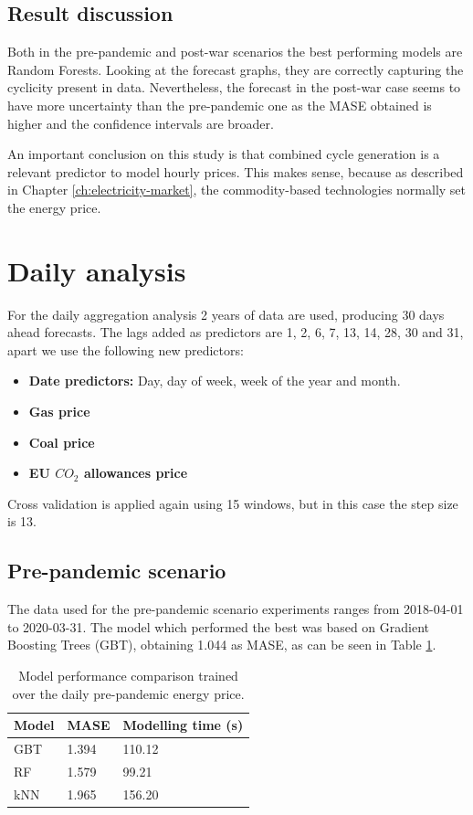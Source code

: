 \subsection{Result discussion}
Both in the pre-pandemic and post-war scenarios the best performing models are Random Forests. Looking at the forecast graphs, they are correctly capturing the cyclicity present in data. Nevertheless, the forecast in the post-war case seems to have more uncertainty than the pre-pandemic one as the MASE obtained is higher and the confidence intervals are broader.

An important conclusion on this study is that combined cycle generation is a relevant predictor to model hourly prices. This makes sense, because as described in Chapter \ref{ch:electricity-market}, the commodity-based technologies normally set the energy price.

\newpage
\section{Daily analysis}
For the daily aggregation analysis 2 years of data are used, producing 30 days ahead forecasts. The lags added as predictors are 1, 2, 6, 7, 13, 14, 28, 30 and 31, apart we use the following new predictors:

\begin{itemize}
    \item \textbf{Date predictors:} Day, day of week, week of the year and month.
    \item \textbf{Gas price}
    \item \textbf{Coal price}
    \item \textbf{EU $CO_2$ allowances price}
\end{itemize}

\noindent Cross validation is applied again using 15 windows, but in this case the step size is 13.

\subsection{Pre-pandemic scenario}
The data used for the pre-pandemic scenario experiments ranges from 2018-04-01 to 2020-03-31. The model which performed the best was based on Gradient Boosting Trees (GBT), obtaining 1.044 as MASE, as can be seen in Table \ref{tab:cv-daily-prep}.

\begin{table}[H]
\centering
\begin{tabular}{@{}l|l|l@{}}
\toprule
Model & MASE  & Modelling time (s)  \\ \midrule
GBT   & 1.394 & 110.12 \\
RF    & 1.579 & 99.21  \\
kNN   & 1.965 & 156.20 \\ \bottomrule
\end{tabular}
\caption{Model performance comparison trained over the daily pre-pandemic energy price.}
\label{tab:cv-daily-prep}
\end{table}

